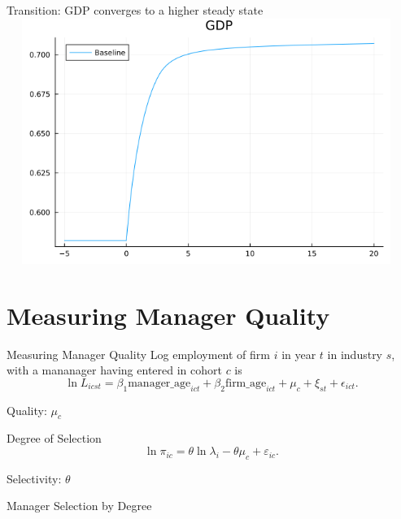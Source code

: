 \documentclass[
  ignorenonframetext,
  aspectratio=1610,
]{beamer}
\begin{document}
\begin{frame}{Transition: GDP converges to a higher steady state}
\protect\hypertarget{transition-gdp-converges-to-a-higher-steady-state}{}
\includegraphics[width=13cm,height=8cm]{fig/model-gdp-liberalization.png}
\end{frame}

\section{Measuring Manager Quality}\label{measuring-manager-quality}

\begin{frame}{Measuring Manager Quality}
\protect\hypertarget{measuring-manager-quality-1}{}
Log employment of firm \(i\) in year \(t\) in industry \(s\), with a
mananager having entered in cohort \(c\) is \[
\ln L_{icst} = \beta_1\text{manager\_age}_{ict} + \beta_2\text{firm\_age}_{ict}  + \mu_{c} + \xi_{st} + \epsilon_{ict}.
\]

Quality: \(\mu_c\)
\end{frame}

\begin{frame}{Degree of Selection}
\protect\hypertarget{degree-of-selection}{}
\[
\ln \pi_{ic} = \theta\ln\lambda_i  - \theta \mu_c + \varepsilon_{ic}.
\]

Selectivity: \(\theta\)
\end{frame}

\begin{frame}{Manager Selection by Degree}
\protect\hypertarget{manager-selection-by-degree}{}

\end{frame}
\end{document}
